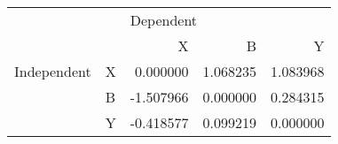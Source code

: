 \begin{tabular}{llrrr}
\toprule
            &   & \multicolumn{3}{l}{Dependent} \\
            &   &         X &         B &         Y \\
\midrule
Independent & X &  0.000000 &  1.068235 &  1.083968 \\
            & B & -1.507966 &  0.000000 &  0.284315 \\
            & Y & -0.418577 &  0.099219 &  0.000000 \\
\bottomrule
\end{tabular}
